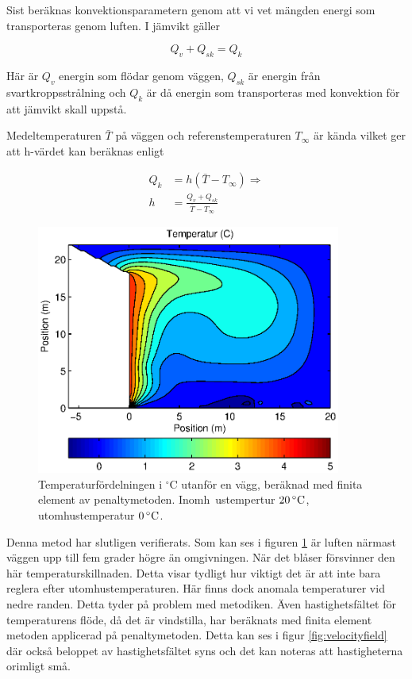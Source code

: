 Sist beräknas konvektionsparametern genom att vi vet mängden energi som transporteras
genom luften. I jämvikt gäller

\begin{equation}
\label{eq:convectionmethod:balance}
Q_v + Q_{sk} = Q_k
\end{equation}

Här är $Q_v$ energin som flödar genom väggen, $Q_{sk}$ är energin från
svartkroppsstrålning och $Q_k$ är då energin som transporteras med konvektion
för att jämvikt skall uppstå.

Medeltemperaturen $\bar{T}$ på väggen och referenstemperaturen $T_\infty$ är kända
vilket ger att h-värdet kan beräknas enligt

\begin{align}
Q_k &= h(\bar{T}-T_\infty) \Rightarrow \nonumber \\
h &= \frac{Q_v + Q_{sk}}{\bar{T}-T_\infty}
\end{align}


\begin{figure}[hpbt]
\centering
\includegraphics[width=10cm]{images/convectemperature.eps}
\caption{\label{fig:temp_dist}Temperaturfördelningen i $^\circ\mbox{C}$ utanför en vägg, beräknad med finita element av penaltymetoden. Inomh\
ustempertur $\unit[20]{^\circ C}$, utomhustemperatur $\unit[0]{^\circ C}$.}
\end{figure}

Denna metod har slutligen verifierats. Som kan ses i figuren \ref{fig:temp_dist} är luften närmast väggen upp till fem grader 
högre än omgivningen. När det blåser försvinner den här temperaturskillnaden. Detta
visar tydligt hur viktigt det är att inte bara reglera efter utomhustemperaturen.
Här finns dock anomala temperaturer vid nedre randen. Detta tyder på problem med
metodiken.
Även hastighetsfältet för temperaturens flöde, då det är vindstilla, har beräknats med finita element metoden
applicerad på penaltymetoden. Detta kan ses i figur \ref{fig:velocityfield} där också
beloppet av hastighetsfältet syns och det kan noteras att hastigheterna orimligt små.

